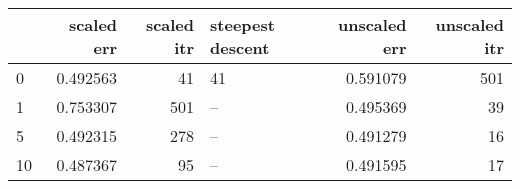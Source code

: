\begin{tabular}{lrrlrr}
\toprule
{} &  scaled err &  scaled itr & steepest descent &  unscaled err &  unscaled itr \\
\midrule
0  &    0.492563 &          41 &               41 &      0.591079 &           501 \\
1  &    0.753307 &         501 &               -- &      0.495369 &            39 \\
5  &    0.492315 &         278 &               -- &      0.491279 &            16 \\
10 &    0.487367 &          95 &               -- &      0.491595 &            17 \\
\bottomrule
\end{tabular}
